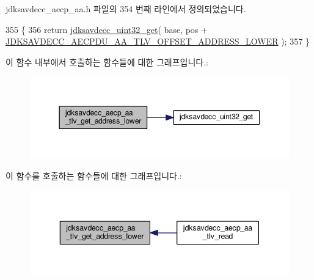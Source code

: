 jdksavdecc\+\_\+aecp\+\_\+aa.\+h 파일의 354 번째 라인에서 정의되었습니다.


\begin{DoxyCode}
355 \{
356     \textcolor{keywordflow}{return} \hyperlink{group__endian_gaefcf5bd4f368997a82f358ab89052d6b}{jdksavdecc\_uint32\_get}( base, pos + 
      \hyperlink{group___a_e_c_p___a_a__tlv_ga434b44cc7306a8c79c916c5fa226e951}{JDKSAVDECC\_AECPDU\_AA\_TLV\_OFFSET\_ADDRESS\_LOWER} );
357 \}
\end{DoxyCode}


이 함수 내부에서 호출하는 함수들에 대한 그래프입니다.\+:
\nopagebreak
\begin{figure}[H]
\begin{center}
\leavevmode
\includegraphics[width=350pt]{group__aecp__aa__tlv_ga11c316fda9bff646d2d134e03c39d6a4_cgraph}
\end{center}
\end{figure}




이 함수를 호출하는 함수들에 대한 그래프입니다.\+:
\nopagebreak
\begin{figure}[H]
\begin{center}
\leavevmode
\includegraphics[width=343pt]{group__aecp__aa__tlv_ga11c316fda9bff646d2d134e03c39d6a4_icgraph}
\end{center}
\end{figure}


